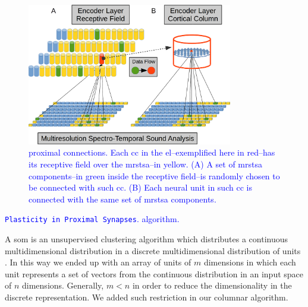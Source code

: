 \documentclass[10pt,letterpaper]{article}
\begin{document}
\begin{figure}[h!]
    \centering
    \includegraphics[width=0.8\textwidth]{EncoderProximalConnections.png}
    \caption{\textcolor{blue}{ proximal connections. Each \gls{cc} in the \gls{el}--exemplified here in red--has its receptive field over the \gls{mrstsa}--in yellow.
    (A) A set of \gls{mrstsa} components--in green inside the receptive field--is randomly chosen to be connected with such \gls{cc}.
    (B) Each neural unit in such \gls{cc} is connected with the same set of \gls{mrstsa} components.}}
    \label{fig:EncoderProximalConnections}
\end{figure}


\begin{algorithm}
	\caption{\textcolor{blue}{\texttt{Plasticity in Proximal Synapses}.  algorithm.}}
\label{csom_proximal_synapses}
\begin{algorithmic}[1]
\end{algorithmic}
\end{algorithm}

A \gls{som} is an unsupervised clustering algorithm which distributes a continuous multidimensional distribution
in a discrete multidimensional distribution of units \cite{Kohonen:1989:SAM:69371, kohonen_2082}.
In this way we ended up with an array of units of $m$ dimensions in which each unit
represents a set of vectors from the continuous distribution in an input space of $n$ dimensions.
Generally, $m < n$ in order to reduce the dimensionality in the discrete representation.
We added such restriction in our columnar algorithm.
\end{document}
